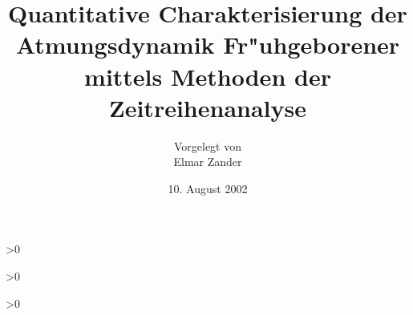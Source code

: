 \documentclass[twoside,a4paper,11pt]{scrreprt}
\def\frontmatter{}
\def\mainmatter{}
\def\backmatter{}
\def\manuscript{0}
\def\alles{1}
\def\manusscriptfile{manuscript1}
\begin{document}
\frontmatter

\titlepage
\subject{Dilpomarbeit angefertigt am Institut f"ur Theoretische Physik
I\\Wilhelm-Klemm-Str.\  9}
\title{Quantitative Charakterisierung der Atmungsdynamik Fr"uhgeborener mittels Methoden
der Zeitreihenanalyse}
\author{Vorgelegt von \\ Elmar Zander}
\date{10. August 2002}

\maketitle

\ifnum\alles>0
\tableofcontents
\fi


\ifnum\manuscript>0

\fi

\ifnum\alles>0




\mainmatter



%
%


\begin{appendix}
\end{appendix}


\comment{\nocite{*}}
\fi

\backmatter

\newpage
{}

%
%

\end{document}

